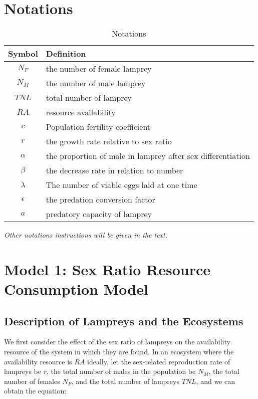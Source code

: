 \documentclass[12pt]{article}  %
\begin{document}
\section{Notations}
\begin{table}[!htbp]
\begin{center}
\begin{threeparttable}
\caption{Notations}\label{notations}
\begin{tabular}{cl}
	\toprule
	\multicolumn{1}{m{3cm}}{\centering Symbol}
	&\multicolumn{1}{m{12cm}}{\centering Definition}\\
	\midrule
	$N_{F}$&the number of female lamprey\\
	$N_{M}$&the number of male lamprey\\
	$TNL$ &total number of lamprey\\
	$RA$&resource availability\\
	$c$&Population fertility coefficient\\
	$r$ &the growth rate relative to sex ratio\\
	$\alpha$ &the proportion of male in lamprey after sex differentiation\\
	$\beta$ &the decrease rate in relation to number\\
	$\lambda$&The number of viable eggs laid at one time\\
	$\epsilon$&the predation conversion factor\\
	$a$&predatory capacity of lamprey\\
	\bottomrule
\end{tabular}
\small
\textit{Other notations instructions will be given in the text.}
\end{threeparttable}
\end{center}
\end{table}

\section{Model 1: Sex Ratio Resource Consumption Model}
\subsection{Description of Lampreys and the Ecosystems}
We first consider the effect of the sex ratio of lampreys on the availability resource of the system in which they are found. In an ecosystem where the availability resource is $RA$ ideally, let the sex-related reproduction rate of lampreys be $r$, the total number of males in the population be $N_M$, the total number of females $N_F$, and the total number of lampreys $TNL$, and we can obtain the equation:
\end{document}
